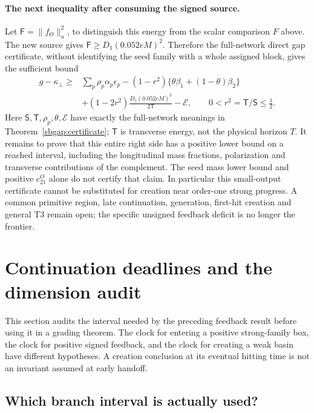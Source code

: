 \documentclass{article} %
\theoremstyle{plain}
\theoremstyle{definition}
\theoremstyle{remark}
\begin{document}
\paragraph{The next inequality after consuming the signed source.}
Let $\mathsf F=\|f_O\|_n^2$, to distinguish this energy from the scalar
comparison $F$ above. The new source gives
$\mathsf F\ge D_1(0.052eM)^2$. Therefore the full-network direct gap
certificate, without identifying the seed family with a whole assigned
block, gives the sufficient bound
\begin{equation}\label{sbwindow:next-gap}
 \begin{split}
 g-\kappa_\perp\ge{}&
 \sum_p\rho_p\alpha_p\epsilon_p
 -(1-r^2)\{\theta\beta_1+(1-\theta)\beta_2\}\\
 &+(1-2r^2)\frac{D_1(0.052eM)^2}{2\mathsf T}-\mathcal E,
 \qquad 0<r^2=\mathsf T/\mathsf S\le\tfrac12.
 \end{split}
\end{equation}
Here $\mathsf S,\mathsf T,\rho_p,\theta,\mathcal E$ have exactly the
full-network meanings in Theorem~\ref{sbgap:certificate}; $\mathsf T$ is
transverse energy, not the physical horizon $T$.
It remains to prove that this entire right side has a positive lower
bound on a reached interval, including the longitudinal mass fractions,
polarization and transverse contributions of the complement. The seed
mass lower bound and positive $c_{21}^O$ alone do not certify that claim.
In particular this small-output certificate cannot be substituted for
creation near order-one strong progress. A common primitive region,
late continuation, generation, first-hit creation and general T3 remain
open; the specific unsigned feedback deficit is no longer the frontier.

\section{Continuation deadlines and the dimension audit}
\label{sbguard:scope}

This section audits the interval needed by the preceding feedback result
before using it in a grading theorem. The clock for entering a positive
strong-family box, the clock for positive signed feedback, and the clock
for creating a weak basin have different hypotheses. A creation conclusion
at its eventual hitting time is not an invariant assumed at early handoff.

\subsection{Which branch interval is actually used?}
\end{document}
